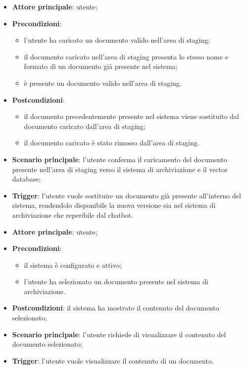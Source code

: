 \documentclass[10pt, a4paper]{article}
\begin{document}
    \begin{itemize}
        \item \textbf{Attore principale}: utente;
        \item \textbf{Precondizioni}:
            \begin{itemize}
                \item l’utente ha caricato un documento valido nell’area di staging;
                \item il documento caricato nell'area di staging presenta lo stesso nome e formato di un documento già presente nel sistema;
                \item è presente un documento valido nell’area di staging.
            \end{itemize}
        \item \textbf{Postcondizioni}:
            \begin{itemize}
                \item il documento precedentemente presente nel sistema viene sostituito dal documento caricato dall'area di staging;
                \item il documento caricato è stato rimosso dall’area di staging.
            \end{itemize}
        \item \textbf{Scenario principale}: l’utente conferma il caricamento del documento presente nell'area di staging verso il sistema di archiviazione e il vector database;
        \item \textbf{Trigger}: l’utente vuole sostituire un documento già presente all'interno del sistema, rendendolo disponibile la nuova versione sia nel sistema di archiviazione che reperibile dal chatbot.
    \end{itemize}
    

    \begin{itemize}
        \item \textbf{Attore principale}: utente;
        \item \textbf{Precondizioni}:
        \begin{itemize}
            \item il sistema è configurato e attivo;
            \item l’utente ha selezionato un documento presente nel sistema di archiviazione.
        \end{itemize}
        \item \textbf{Postcondizioni}: il sistema ha mostrato il contenuto del documento selezionato;
        \item \textbf{Scenario principale}: l’utente richiede di visualizzare il contenuto del documento selezionato;
        \item \textbf{Trigger}: l’utente vuole visualizzare il contenuto di un documento.
    \end{itemize}
\end{document}
